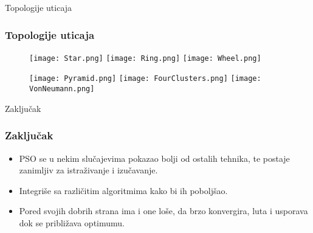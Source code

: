 \documentclass{beamer}
\begin{document}
\begin{frame}{Topologije uticaja}
\frametitle{Topologije uticaja}
\begin{figure}
\texttt{[image: Star.png]}
\texttt{[image: Ring.png]}
\texttt{[image: Wheel.png]}
\end{figure}

\begin{figure}
\texttt{[image: Pyramid.png]}
\texttt{[image: FourClusters.png]}
\texttt{[image: VonNeumann.png]}
\end{figure}

\end{frame}

\begin{frame}{Zaključak}
\frametitle{Zaključak}
    \begin{itemize}
        \item PSO se u nekim slučajevima pokazao bolji od ostalih tehnika, te postaje zanimljiv za istraživanje i izučavanje.
        \item Integriše sa različitim algoritmima kako bi ih poboljšao.   
        \item Pored svojih dobrih strana ima i one loše, da brzo konvergira, luta i usporava dok se približava optimumu.
    \end{itemize}
\end{frame}
\end{document}
